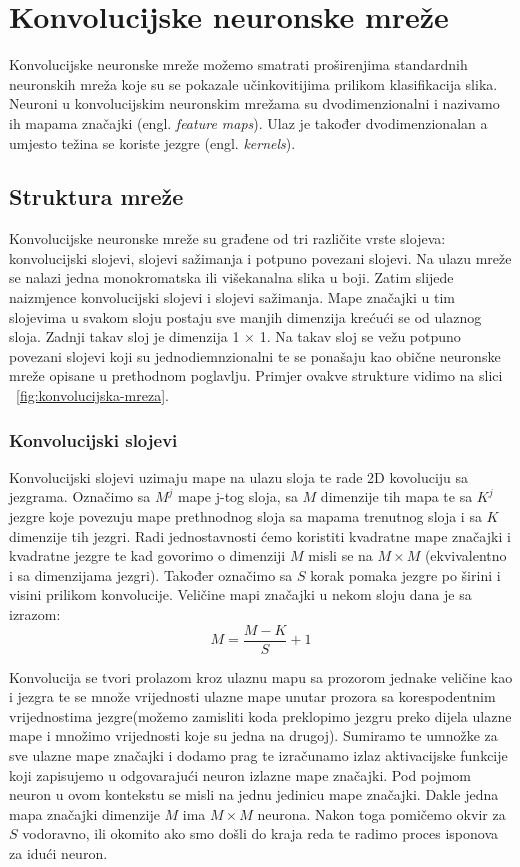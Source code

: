 \documentclass[times, utf8, zavrsni, numeric]{fer}
\begin{document}
\chapter{Konvolucijske neuronske mreže}
Konvolucijske neuronske mreže možemo smatrati proširenjima standardnih neuronskih mreža koje su se pokazale učinkovitijima prilikom klasifikacija slika. Neuroni u konvolucijskim neuronskim mrežama su dvodimenzionalni i nazivamo ih mapama značajki (engl. \textit{feature maps}). Ulaz je također dvodimenzionalan a umjesto težina se koriste jezgre (engl. \textit{kernels}).

\section{Struktura mreže}
Konvolucijske neuronske mreže su građene od tri različite vrste slojeva: konvolucijski slojevi, slojevi sažimanja i potpuno povezani slojevi. Na ulazu mreže se nalazi jedna monokromatska ili višekanalna slika u boji. Zatim slijede naizmjence konvolucijski slojevi i slojevi sažimanja. Mape značajki u tim slojevima u svakom sloju postaju sve manjih dimenzija krećući se od ulaznog sloja. Zadnji takav sloj je dimenzija 1 $\times$ 1. Na takav sloj se vežu potpuno povezani slojevi koji su jednodiemnzionalni te se ponašaju kao obične neuronske mreže opisane u prethodnom poglavlju. Primjer ovakve strukture vidimo na slici ~\ref{fig:konvolucijska-mreza}.
\subsection{Konvolucijski slojevi}
Konvolucijski slojevi uzimaju mape na ulazu sloja te rade 2D kovoluciju sa jezgrama. Označimo sa $M^j$ mape j-tog sloja, sa $M$ dimenzije tih mapa te sa $K^j$ jezgre koje povezuju mape prethnodnog sloja sa mapama trenutnog sloja i sa $K$ dimenzije tih jezgri. Radi jednostavnosti ćemo koristiti kvadratne mape značajki i kvadratne jezgre te kad govorimo o dimenziji $M$ misli se na $M \times M$ (ekvivalentno i sa dimenzijama jezgri). Također označimo sa $S$ korak pomaka jezgre po širini i visini prilikom konvolucije. Veličine mapi značajki u nekom sloju dana je sa izrazom:
\begin{equation}
M = \frac{M - K}{S} + 1
\end{equation}

Konvolucija se tvori prolazom kroz ulaznu mapu sa prozorom jednake veličine kao i jezgra te se množe vrijednosti ulazne mape unutar prozora sa korespodentnim vrijednostima jezgre(možemo zamisliti koda preklopimo jezgru preko dijela ulazne mape i množimo vrijednosti koje su jedna na drugoj). Sumiramo te umnožke za sve ulazne mape značajki i dodamo prag te izračunamo izlaz aktivacijske funkcije koji zapisujemo u odgovarajući neuron izlazne mape značajki. Pod pojmom neuron u ovom kontekstu se misli na jednu jedinicu mape značajki. Dakle jedna mapa značajki dimenzije $M$ ima $M \times M$ neurona. Nakon toga pomičemo okvir za $S$ vodoravno, ili okomito ako smo došli do kraja reda te radimo proces isponova za idući neuron.
\end{document}
